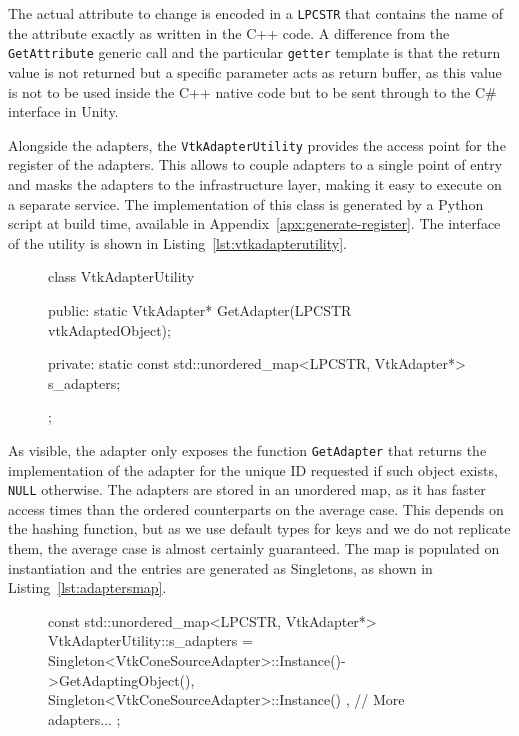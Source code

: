 The actual attribute to change is encoded in a \verb|LPCSTR| that contains the name of the attribute exactly as written in the C++ code. A difference from the \verb|GetAttribute| generic call and the particular \verb|getter| template is that the return value is not returned but a specific parameter acts as return buffer, as this value is not to be used inside the C++ native code but to be sent through to the C\# interface in Unity.

Alongside the adapters, the \verb|VtkAdapterUtility| provides the access point for the register of the adapters. This allows to couple adapters to a single point of entry and masks the adapters to the infrastructure layer, making it easy to execute on a separate service. The implementation of this class is generated by a Python script at build time, available in Appendix~\ref{apx:generate-register}. The interface of the utility is shown in Listing~\ref{lst:vtkadapterutility}.

\begin{figure}
    \centering
    \begin{cpp}[label=lst:vtkadapterutility,caption={VtkAdapterUtility interface}]
class VtkAdapterUtility
{
public:
	static VtkAdapter* GetAdapter(LPCSTR vtkAdaptedObject);

private:
	static const std::unordered_map<LPCSTR, VtkAdapter*> s_adapters;
};
    \end{cpp}
\end{figure}

As visible, the adapter only exposes the function \verb|GetAdapter| that returns the implementation of the adapter for the unique ID requested if such object exists, \verb|NULL| otherwise. The adapters are stored in an unordered map, as it has faster access times than the ordered counterparts \cite{stdunord16, stdmapcp55} on the average case. This depends on the hashing function, but as we use default types for keys and we do not replicate them, the average case is almost certainly guaranteed. The map is populated on instantiation and the entries are generated as Singletons, as shown in Listing~\ref{lst:adaptersmap}.

\begin{figure}
    \centering
    \begin{cpp}[label=lst:adaptersmap,caption={Example of adapters register instantiation.}]
const std::unordered_map<LPCSTR, VtkAdapter*> VtkAdapterUtility::s_adapters =
{
	{ Singleton<VtkConeSourceAdapter>::Instance()->GetAdaptingObject(), Singleton<VtkConeSourceAdapter>::Instance() },
	// More adapters...
};
    \end{cpp}
\end{figure}

